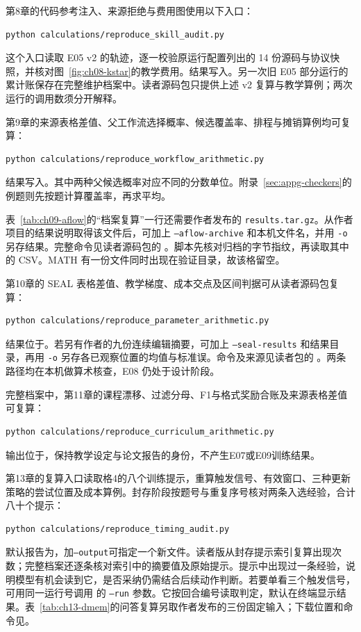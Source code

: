 第8章的代码参考注入、来源拒绝与费用图使用以下入口：
\begin{verbatim}
python calculations/reproduce_skill_audit.py
\end{verbatim}
这个入口读取 E05 v2 的轨迹，逐一校验原运行配置列出的 14 份源码与协议快照，并核对图~\ref{fig:ch08-kstar}的教学费用。结果写入。另一次旧 E05 部分运行的累计账保存在完整维护档案中。读者源码包只提供上述 v2 复算与教学算例；两次运行的调用数须分开解释。

\begin{samepage}
第9章的来源表格差值、父工作流选择概率、候选覆盖率、排程与摊销算例均可复算：
\begin{verbatim}
python calculations/reproduce_workflow_arithmetic.py
\end{verbatim}
\end{samepage}
结果写入\allowbreak{}。其中两种父候选概率对应不同的分数单位。附录~\ref{sec:appg-checkers}的例题则先按题计算覆盖率，再求平均。

表~\ref{tab:ch09-aflow}的“档案复算”一行还需要作者发布的 \nolinkurl{results.tar.gz}。从作者项目的结果说明取得该文件后，可加上 \texttt{--aflow-archive} 和本机文件名，并用 \texttt{-o} 另存结果。完整命令见读者源码包的 。脚本先核对归档的字节指纹，再读取其中的 CSV。MATH 有一份文件同时出现在验证目录，故该格留空。

第10章的 SEAL 表格差值、教学梯度、成本交点及区间判据可从读者源码包复算：
\begin{verbatim}
python calculations/reproduce_parameter_arithmetic.py
\end{verbatim}
结果位于\allowbreak{}。若另有作者的九份连续编辑摘要，可加上 \texttt{--seal-results} 和结果目录，再用 \texttt{-o} 另存各已观察位置的均值与标准误。命令及来源见读者包的 。两条路径均在本机做算术核查，E08 仍处于设计阶段。

完整档案中，第11章的课程漂移、过滤分母、F1与格式奖励合账及来源表格差值可复算：
\begin{verbatim}
python calculations/reproduce_curriculum_arithmetic.py
\end{verbatim}
输出位于\allowbreak{}，保持教学设定与论文报告的身份，不产生E07或E09训练结果。

第13章的复算入口读取格4的八个训练提示，重算触发信号、有效窗口、三种更新策略的尝试位置及成本算例。封存阶段按题号与重复序号核对两条入选经验，合计八十个提示：
\begin{verbatim}
python calculations/reproduce_timing_audit.py
\end{verbatim}
默认报告为\allowbreak{}，加\texttt{--output}可指定一个新文件。读者版从封存提示索引复算出现次数；完整档案还逐条核对索引中的摘要值及原始提示。提示中出现过一条经验，说明模型有机会读到它，是否采纳仍需结合后续动作判断。若要单看三个触发信号，可用同一运行号调用  的 \texttt{--run} 参数。它按回合编号读取判定，默认在终端显示结果。表~\ref{tab:ch13-dmem}的问答复算另取作者发布的三份固定输入；下载位置和命令见。


